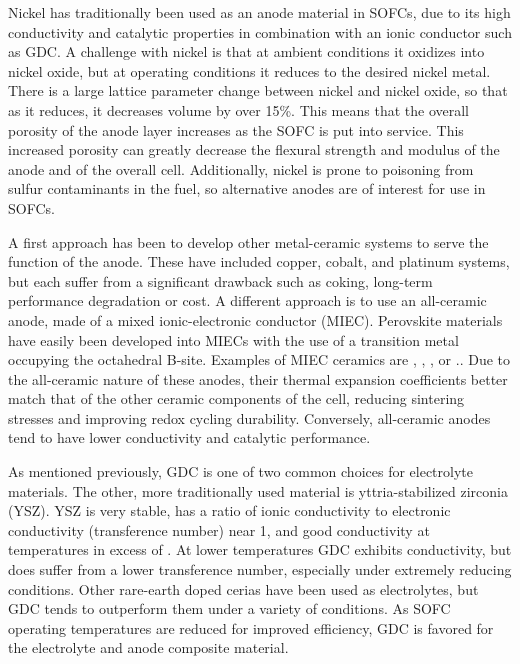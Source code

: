 Nickel has traditionally been used as an anode material in SOFCs, due to its high conductivity and catalytic properties in combination with an ionic conductor such as GDC. %
A challenge with nickel is that at ambient conditions it oxidizes into nickel oxide, but at operating conditions it reduces to the desired nickel metal.
There is a large lattice parameter change between nickel and nickel oxide, so that as it reduces, it decreases volume by over 15\%.
This means that the overall porosity of the anode layer increases as the SOFC is put into service.\cite{Gutierrez-Mora2002,Yu2007}
This increased porosity can greatly decrease the flexural strength and modulus of the anode and of the overall cell.\cite{Callister2014,Barsoum2003}
Additionally, nickel is prone to poisoning from sulfur contaminants in the fuel, so alternative anodes are of interest for use in SOFCs.

A first approach has been to develop other metal-ceramic systems to serve the function of the anode.
These have included copper, cobalt, and platinum systems, but each suffer from a significant drawback such as coking, long-term performance degradation or cost.
A different approach is to use an all-ceramic anode, made of a mixed ionic-electronic conductor (MIEC).
Perovskite materials have easily been developed into MIECs with the use of a transition metal occupying the octahedral B-site.
Examples of MIEC ceramics are , , , or .\cite{Goodenough2007,Zha2005,Primdahl2001,Hussain2013,MohammedHussain2012,Hussain2016,Huang2006}.
Due to the all-ceramic nature of these anodes, their thermal expansion coefficients better match that of the other ceramic components of the cell, reducing sintering stresses and improving redox cycling durability.
Conversely, all-ceramic anodes tend to have lower conductivity and catalytic performance.

As mentioned previously, GDC is one of two common choices for electrolyte materials.
The other, more traditionally used material is yttria-stabilized zirconia (YSZ).
YSZ is very stable, has a ratio of ionic conductivity to electronic conductivity (transference number) near 1, and good conductivity at temperatures in excess of .
At lower temperatures GDC exhibits conductivity, but does suffer from a lower transference number, especially under extremely reducing conditions.
Other rare-earth doped cerias have been used as electrolytes, but GDC tends to outperform them under a variety of conditions.
As SOFC operating temperatures are reduced for improved efficiency, GDC is favored for the electrolyte and anode composite material.

